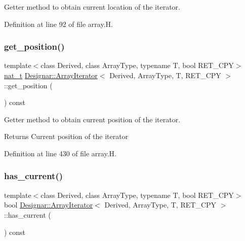 Getter method to obtain current location of the iterator. 



Definition at line 92 of file array.\+H.

\mbox{\label{class_designar_1_1_array_iterator_a209ca14a9628f0a67a258469d98089b8}} 
\subsubsection{\texorpdfstring{get\+\_\+position()}{get\_position()}}
{\footnotesize\ttfamily template$<$class Derived, class Array\+Type, typename T, bool R\+E\+T\+\_\+\+C\+PY$>$ \\
\hyperlink{namespace_designar_aa72662848b9f4815e7bf31a7cf3e33d1}{nat\+\_\+t} \hyperlink{class_designar_1_1_array_iterator}{Designar\+::\+Array\+Iterator}$<$ Derived, Array\+Type, T, R\+E\+T\+\_\+\+C\+PY $>$\+::get\+\_\+position (\begin{DoxyParamCaption}{ }\end{DoxyParamCaption}) const\hspace{0.3cm}{\ttfamily [inline]}}



Getter method to obtain current position of the iterator. 

\begin{DoxyReturn}{Returns}
Current position of the iterator 
\end{DoxyReturn}


Definition at line 430 of file array.\+H.

\mbox{\label{class_designar_1_1_array_iterator_aafec192c97299c4f21c28c65e58b19fc}} 
\subsubsection{\texorpdfstring{has\+\_\+current()}{has\_current()}}
{\footnotesize\ttfamily template$<$class Derived, class Array\+Type, typename T, bool R\+E\+T\+\_\+\+C\+PY$>$ \\
bool \hyperlink{class_designar_1_1_array_iterator}{Designar\+::\+Array\+Iterator}$<$ Derived, Array\+Type, T, R\+E\+T\+\_\+\+C\+PY $>$\+::has\+\_\+current (\begin{DoxyParamCaption}{ }\end{DoxyParamCaption}) const\hspace{0.3cm}{\ttfamily [inline]}}



